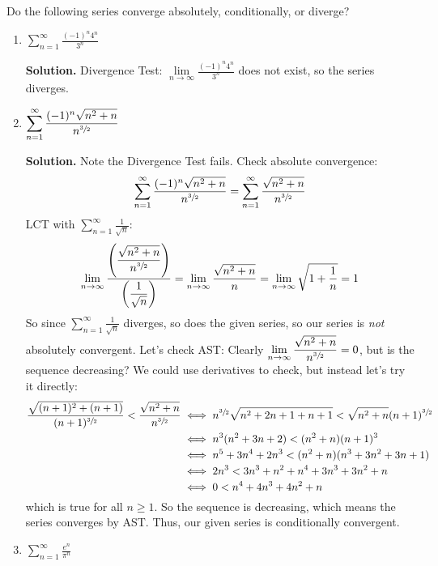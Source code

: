 \begin{Example}{}{}
    Do the following series converge absolutely, conditionally, or diverge?
    \begin{enumerate}[label=(\roman*)]
        \item $ \displaystyle \sum\limits_{n=1}^{\infty} \frac{(-1)^n4^n}{3^n} $

              \textbf{Solution.} Divergence Test: $ \displaystyle \lim\limits_{{n} \to {\infty}}
                  \frac{(-1)^n4^n}{3^n} $ does not exist, so the series diverges.
        \item $ \displaystyle \sum\limits_{n=1}^{\infty} \frac{(-1)^n\sqrt{n^2+n}}{n^{\sfrac{3}{2}}} $

              \textbf{Solution.} Note the Divergence Test fails. Check absolute convergence:
              \[ \sum\limits_{n=1}^{\infty} \frac{(-1)^n\sqrt{n^2+n}}{n^{\sfrac{3}{2}}}=
                  \sum\limits_{n=1}^{\infty}\frac{\sqrt{n^2+n}}{n^{\sfrac{3}{2}}} \]
              LCT with $ \displaystyle \sum\limits_{n=1}^{\infty} \frac{1}{\sqrt{n}} $:
              \[ \lim\limits_{{n} \to {\infty}}
                  \frac{\left( \dfrac{\sqrt{n^2+n}}{n^{\sfrac{3}{2}}} \right)}{
                      \left( \dfrac{1}{\sqrt{n}} \right)
                  }
                  =\lim\limits_{{n} \to {\infty}} \frac{\sqrt{n^2+n}}{n}
                  =\lim\limits_{{n} \to {\infty}}\sqrt{1+\frac{1}{n}}=1 \]
              So since $ \displaystyle \sum\limits_{n=1}^{\infty} \frac{1}{\sqrt{n}} $ diverges, so does
              the given series, so our series is \emph{not} absolutely convergent. Let's check
              AST\@: Clearly $ \displaystyle \lim\limits_{{n} \to {\infty}} \frac{\sqrt{n^2+n}}{n^{\sfrac{3}{2}}}=0 $,
              but is the sequence decreasing? We could use derivatives to check, but instead let's try
              it directly:
              \begin{align*}
                  \frac{\sqrt{(n+1)^2+(n+1)}}{(n+1)^{\sfrac{3}{2}}}<\frac{\sqrt{n^2+n}}{n^{\sfrac{3}{2}}}
                   & \iff n^{\sfrac{3}{2}}\sqrt{n^2+2n+1+n+1}<\sqrt{n^2+n}(n+1)^{\sfrac{3}{2}} \\
                   & \iff n^3(n^2+3n+2)<(n^2+n)(n+1)^3                                         \\
                   & \iff n^5+3n^4+2n^3<(n^2+n)(n^3+3n^2+3n+1)                                 \\
                   & \iff 2n^3<3n^3+n^2+n^4+3n^3+3n^2+n                                        \\
                   & \iff 0<n^4+4n^3+4n^2+n
              \end{align*}
              which is true for all $ n\geqslant 1 $. So the sequence is decreasing, which means
              the series converges by AST\@. Thus, our given series is conditionally convergent.
        \item $ \displaystyle \sum\limits_{n=1}^{\infty} \frac{e^n}{\pi^n} $


\end{enumerate}
\end{Example}
